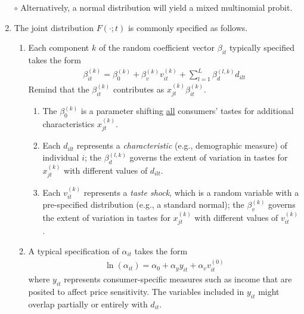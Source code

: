\documentclass[11pt]{elegantbook}
\begin{document}
\begin{enumerate}
    \subitem $\circ$ Alternatively, a normal distribution will yield a mixed multinomial probit.
    \item The joint distribution $F(\cdot;t)$ is commonly specified as follows.
    \begin{enumerate}
        \item Each component $k$ of the random coefficient vector $\beta_{it}$ typically specified takes the form
        \begin{equation}
            \begin{aligned}
                \beta_{it}^{(k)}=\beta_{0}^{(k)}+\beta_{v}^{(k)}v_{it}^{(k)}+\sum_{l=1}^L\beta_{d}^{(l,k)}d_{ilt}
            \end{aligned}
            \label{eq:beta_it}
        \end{equation}
        Remind that the $\beta_{it}^{(k)}$ contributes as $x_{jt}^{(k)}\beta_{it}^{(k)}$.
        \begin{enumerate}
            \item The $\beta_{0}^{(k)}$ is a parameter shifting \underline{all} consumers' tastes for additional characteristics $x_{jt}^{(k)}$.
            \item Each $d_{ilt}$ represents a \textit{characteristic} (e.g., demographic measure) of individual $i$; the $\beta_{d}^{(l,k)}$ governs the extent of variation in tastes for $x_{jt}^{(k)}$ with different values of $d_{ilt}$.
            \item Each $v_{it}^{(k)}$ represents a \textit{taste shock}, which is a random variable with a pre-specified distribution (e.g., a standard normal); the $\beta_{v}^{(k)}$ governs the extent of variation in tastes for $x_{jt}^{(k)}$ with different values of $v_{it}^{(k)}$.
        \end{enumerate}
        \item A typical specification of $\alpha_{it}$ takes the form
        \begin{equation}
            \begin{aligned}
                \ln(\alpha_{it})=\alpha_0+\alpha_y y_{it}+\alpha_v v_{it}^{(0)}
            \end{aligned}
            \label{eq:alpha_it}
        \end{equation}
        where $y_{it}$ represents consumer-specific measures such as income that are posited to affect price sensitivity. The variables included in $y_{it}$ might overlap partially or entirely with $d_{it}$.
    \end{enumerate}
\end{enumerate}
\end{document}
